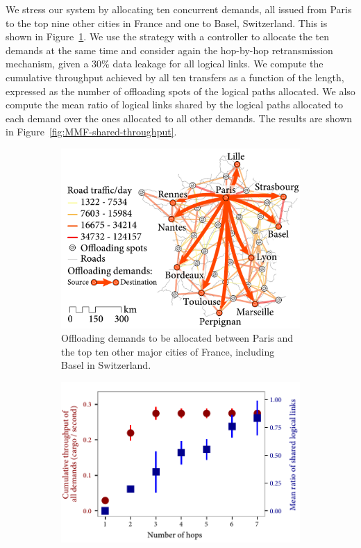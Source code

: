 We stress our system by allocating ten concurrent demands, all issued from Paris to the top nine other cities in France and one to Basel, Switzerland. This is shown in Figure~\ref{fig:10-demands-france}. We use the strategy with a controller to allocate the ten demands at the same time and consider again the \textsf{hop-by-hop} retransmission mechanism, given a 30\% data leakage for all logical links. We compute the cumulative throughput achieved by all ten transfers as a function of the length, expressed as the number of offloading spots of the logical paths allocated. We also compute the mean ratio of logical links shared by the logical paths allocated to each demand over the ones allocated to all other demands. The results are shown in Figure~\ref{fig:MMF-shared-throughput}. 

\begin{figure}[!ht]
    \vspace{-15pt}
    \begin{subfigure}[b]{0.45\textwidth}
        \centering
        \includegraphics[width=\textwidth]{figures/France-overlay-transfers.pdf}
        \caption{Offloading demands to be allocated between Paris and the top ten other major cities of France, including Basel in Switzerland.}
        \label{fig:10-demands-france}
    \end{subfigure}%
    \qquad
    \begin{subfigure}[b]{0.45\textwidth}
        \centering
        \includegraphics[width=\textwidth]{results/plot-france-MMF-shared-throughput.pdf}

\end{subfigure}
\end{figure}
